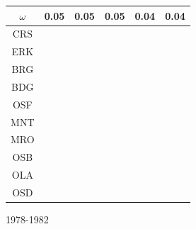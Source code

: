 \documentclass[12pt]{article}
\begin{document}
\begin{landscape}
\begin{figure}
\begin{minipage}[c]{0.3\textwidth}
\begin{tabular}{|c|c|c|c|c|c|}
         $\omega$&0.05&0.05&0.05&0.04&0.04 \\ \hline
        CRS&\cellcolor[HTML]{E41A1C}&\cellcolor[HTML]{E41A1C}&\cellcolor[HTML]{E41A1C}&\cellcolor[HTML]{E41A1C}&\cellcolor[HTML]{E41A1C} \\ \hline
        ERK&\cellcolor[HTML]{E41A1C}&\cellcolor[HTML]{E41A1C}&\cellcolor[HTML]{E41A1C}&\cellcolor[HTML]{377EB8}&\cellcolor[HTML]{377EB8} \\ \hline
        BRG&\cellcolor[HTML]{377EB8}&\cellcolor[HTML]{377EB8}&\cellcolor[HTML]{377EB8}&\cellcolor[HTML]{4DAF4A}&\cellcolor[HTML]{4DAF4A} \\ \hline
        BDG&\cellcolor[HTML]{377EB8}&\cellcolor[HTML]{377EB8}&\cellcolor[HTML]{377EB8}&\cellcolor[HTML]{4DAF4A}&\cellcolor[HTML]{4DAF4A} \\ \hline
        OSF&\cellcolor[HTML]{377EB8}&\cellcolor[HTML]{377EB8}&\cellcolor[HTML]{377EB8}&\cellcolor[HTML]{4DAF4A}&\cellcolor[HTML]{4DAF4A} \\ \hline
        MNT&\cellcolor[HTML]{4DAF4A}&\cellcolor[HTML]{4DAF4A}&\cellcolor[HTML]{4DAF4A}&\cellcolor[HTML]{984EA3}&\cellcolor[HTML]{984EA3} \\ \hline
        MRO&\cellcolor[HTML]{984EA3}&\cellcolor[HTML]{4DAF4A}&\cellcolor[HTML]{4DAF4A}&\cellcolor[HTML]{FF7F00}&\cellcolor[HTML]{984EA3} \\ \hline
        OSB&\cellcolor[HTML]{984EA3}&\cellcolor[HTML]{984EA3}&\cellcolor[HTML]{984EA3}&\cellcolor[HTML]{FFFF33}&\cellcolor[HTML]{984EA3} \\ \hline
        OLA&\cellcolor[HTML]{FF7F00}&\cellcolor[HTML]{984EA3}&\cellcolor[HTML]{FF7F00}&\cellcolor[HTML]{FFFF33}&\cellcolor[HTML]{FF7F00} \\ \hline
        OSD&\cellcolor[HTML]{FF7F00}&\cellcolor[HTML]{FF7F00}&\cellcolor[HTML]{FF7F00}&\cellcolor[HTML]{FFFF33}&\cellcolor[HTML]{FFFF33} \\ \hline
\end{tabular}
\end{minipage}
\caption{1978-1982}
\label{colorTabApp78}
\end{figure}
\end{landscape}

%
\clearpage
%
\end{document}
